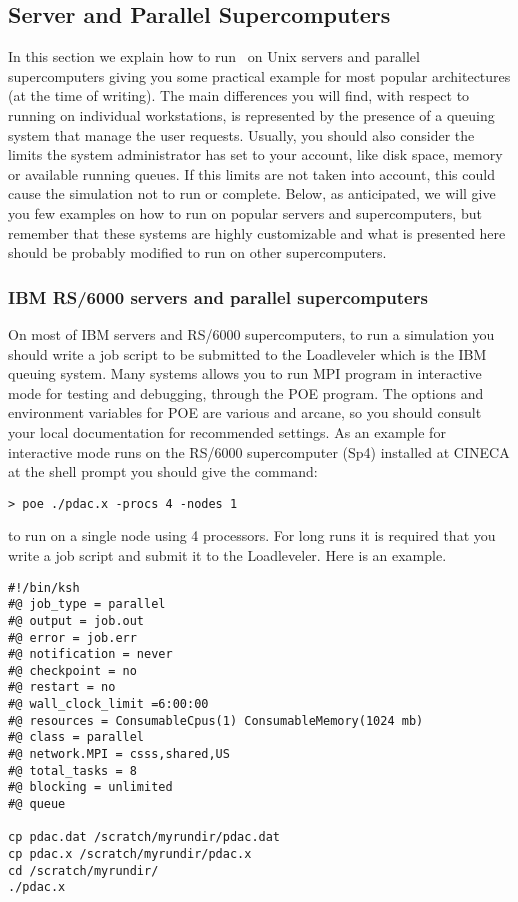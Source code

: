 \subsection{Server and Parallel Supercomputers}

In this section we explain how to run \PDAC\ on Unix servers
and parallel supercomputers giving you some practical example
for most popular architectures (at the time of writing).
The main differences you will find, with respect to running on 
individual workstations,
is represented by the presence of a queuing system that
manage the user requests. Usually, you should also 
consider the limits the system administrator has set to your account,
like disk space, memory or available running queues. 
If this limits are not taken into account, this could cause
the simulation not to run or complete.
Below, as anticipated, we will give you few examples on how to run
on popular servers and supercomputers, but remember that 
these systems are highly customizable and what is presented here
should be probably modified to run on other supercomputers.

\subsubsection{IBM RS/6000 servers and parallel supercomputers}

On most of IBM servers and RS/6000 supercomputers, to run a simulation you
should write a job script to be submitted to the Loadleveler which
is the IBM queuing system.
Many systems allows you to run MPI program in interactive mode for
testing and debugging, through the POE program.  
The options and environment variables for POE are various and arcane, 
so you should consult your local documentation for recommended settings.  
As an example for interactive mode runs on the RS/6000 supercomputer
(Sp4) installed at CINECA at the shell prompt you should give the
command:

\begin{verbatim}
> poe ./pdac.x -procs 4 -nodes 1 
\end{verbatim}

to run on a single node using 4 processors.
For long runs it is required that you write a job script
and submit it to the Loadleveler. Here is an example.

\begin{verbatim}
#!/bin/ksh
#@ job_type = parallel
#@ output = job.out
#@ error = job.err
#@ notification = never
#@ checkpoint = no
#@ restart = no
#@ wall_clock_limit =6:00:00
#@ resources = ConsumableCpus(1) ConsumableMemory(1024 mb)
#@ class = parallel
#@ network.MPI = csss,shared,US
#@ total_tasks = 8
#@ blocking = unlimited
#@ queue

cp pdac.dat /scratch/myrundir/pdac.dat
cp pdac.x /scratch/myrundir/pdac.x
cd /scratch/myrundir/
./pdac.x
\end{verbatim}

